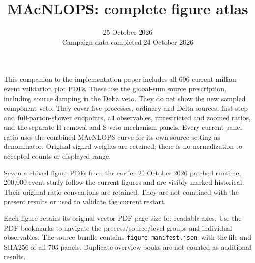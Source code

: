 \documentclass[a4paper]{article}
\begin{document}
\title{MAcNLOPS: complete figure atlas}
\author{}
\date{25 October 2026\\\small Campaign data completed 24 October 2026}
\maketitle
This companion to the implementation paper includes all 696 current
million-event validation plot PDFs. These use the global-sum source
prescription, including source damping in the Delta veto. They do not
show the new sampled component veto. They cover five processes, ordinary
and Delta sources, first-step and full-parton-shower endpoints, all
observables, unrestricted and zoomed ratios, and the separate H-removal
and S-veto mechanism panels. Every current-panel ratio uses the combined MAcNLOPS curve
for its own source setting as denominator. Original signed weights are
retained; there is no normalization to accepted counts or displayed range.

Seven archived figure PDFs from the earlier 20 October 2026 patched-runtime,
200,000-event study follow the current figures and are visibly marked
historical. Their original ratio conventions are retained. They are not combined with the present results or used to
validate the current restart.

Each figure retains its original vector-PDF page size for readable axes.
Use the PDF bookmarks to navigate the process/source/level groups and
individual observables. The source bundle contains
\texttt{figure\_manifest.json}, with the file and SHA256 of all 703 panels.
Duplicate overview books are not counted as additional results.
\clearpage

\end{document}
